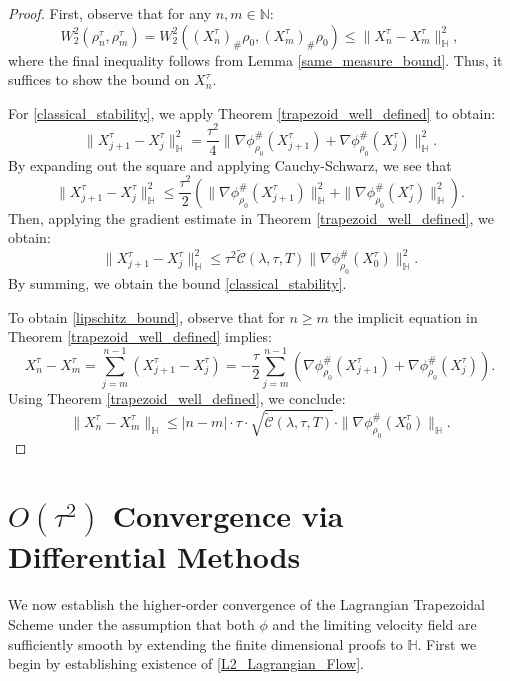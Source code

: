 \documentclass[11pt,a4paper]{amsart}
\newcommand{\1}{\mathds{1}}
\numberwithin{equation}{section}
\begin{document}
\begin{proof}
First, observe that for any $n,m \in \mathbb{N}$:
\[
    W_2^2(\rho_n^{\tau},\rho_{m}^{\tau}) = W_2^2( (X_n^{\tau})_{\#} \rho_0, (X_{m}^{\tau})_{\#} \rho_0) 
    \leq \|X^{\tau}_n-X^{\tau}_{m}\|^2_{\mathbb{H}},
\]
where the final inequality follows from Lemma \ref{same_measure_bound}. Thus, it suffices to show the bound on $X^{\tau}_n$. \smallskip

For \eqref{classical_stability}, we apply Theorem \ref{trapezoid_well_defined} to obtain:
\[
    \|X_{j+1}^{\tau}- X_j^{\tau}\|^2_{\mathbb{H}} 
    = \frac{\tau^2}{4} \|\nabla \phi^{\#}_{\rho_0}(X^{\tau}_{j+1}) +  \nabla \phi^{\#}_{\rho_0}(X^{\tau}_{j})\|^2_{\mathbb{H}}.
\]
By expanding out the square and applying Cauchy-Schwarz, we see that
\[
    \|X_{j+1}^{\tau}- X_j^{\tau}\|^2_{\mathbb{H}} 
    \leq \frac{\tau^2}{2} \left( \|\nabla \phi^{\#}_{\rho_0}(X^{\tau}_{j+1})\|^2_{\mathbb{H}} 
    + \|\nabla \phi^{\#}_{\rho_0}(X^{\tau}_{j})\|^2_{\mathbb{H}} \right).
\]
Then, applying the gradient estimate in Theorem \ref{trapezoid_well_defined}, we obtain:
\[
    \|X_{j+1}^{\tau}- X_j^{\tau}\|^2_{\mathbb{H}} 
    \leq \tau^2  \tilde{\mathcal{C}}(\lambda,\tau,T)  \|\nabla \phi^{\#}_{\rho_0}(X_0^{\tau})\|^2_{\mathbb{H}}.
\]
By summing, we obtain the bound \eqref{classical_stability}. \smallskip

To obtain \eqref{lipschitz_bound}, observe that for $n \geq m$ the implicit equation in Theorem \ref{trapezoid_well_defined} implies:
\[
    X^{\tau}_n - X^{\tau}_m = \sum_{j=m}^{n-1} (X^{\tau}_{j+1} - X^{\tau}_j) 
    = -\frac{\tau}{2} \sum_{j=m}^{n-1}  \left( \nabla \phi^{\#}_{\rho_0}(X^{\tau}_{j+1}) +  \nabla \phi^{\#}_{\rho_0}(X^{\tau}_{j}) \right).
\]
Using Theorem \ref{trapezoid_well_defined}, we conclude:
\[
    \|X^{\tau}_n - X^{\tau}_m\|_{\mathbb{H}} 
    \leq |n-m| \cdot \tau \cdot \sqrt{\tilde{\mathcal{C}}(\lambda,\tau,T)} \cdot \|\nabla \phi^{\#}_{\rho_0}(X^{\tau}_0)\|_{\mathbb{H}}.
\]
\end{proof}

\section{\texorpdfstring{$O(\tau^2)$}{O(tau2)} Convergence via Differential Methods}
\label{higher_order_convg}

 We now establish the higher-order convergence of the Lagrangian Trapezoidal Scheme under the assumption that both $\phi$ and the limiting velocity field are sufficiently smooth by extending the finite dimensional proofs to $\mathbb{H}$. First we begin by establishing existence of \eqref{L2_Lagrangian_Flow}.
\end{document}
